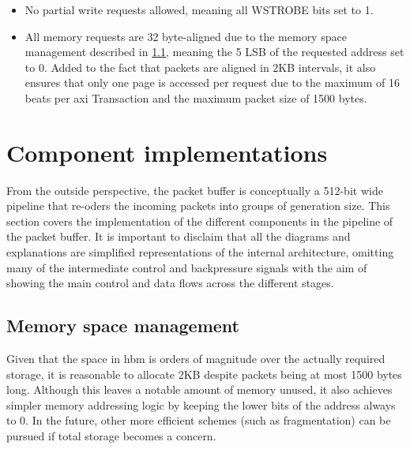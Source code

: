 \begin{itemize}
  \item No partial write requests allowed, meaning all WSTROBE bits set to 1.
  \item All memory requests are 32 byte-aligned due to the memory space management described in \ref{subs:mem_architecture}, 
    meaning the 5 LSB of the requested address set to 0. Added to the fact that packets are aligned in 2KB intervals,
    it also ensures that only one page is accessed per request due to the maximum of 16 beats per \gls{axi} Transaction and 
    the maximum packet size of 1500 bytes.
\end{itemize}

\section{Component implementations}

From the outside perspective, the packet buffer is conceptually a 512-bit wide pipeline that re-oders the incoming packets 
into groups of generation size. This section covers the implementation of the different components in the pipeline of the 
packet buffer. It is important to disclaim that all the diagrams and explanations are simplified representations of the 
internal architecture, omitting many of the intermediate control and backpressure signals with the aim of showing the main 
control and data flows across the different stages. \\


\subsection{Memory space management}\label{subs:mem_architecture}

Given that the space in \gls{hbm} is orders of magnitude over the actually required storage, it is reasonable to allocate 2KB despite 
packets being at most 1500 bytes long. Although this leaves a notable amount of memory unused, it also achieves simpler memory addressing logic
by keeping the lower bits of the address always to 0. In the future, other more efficient schemes (such as fragmentation) can be pursued 
if total storage becomes a concern.\\ 

